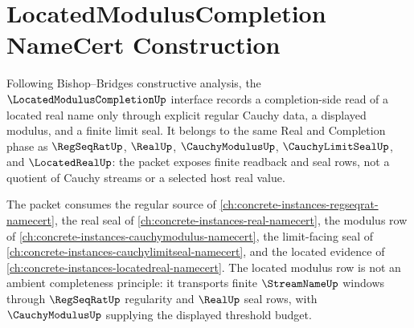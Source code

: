 \chapter{LocatedModulusCompletion NameCert Construction}
\label{ch:concrete-instances-locatedmoduluscompletion-namecert}

Following Bishop--Bridges constructive analysis, the $\LocatedModulusCompletionUp$ interface records a completion-side read of a located real name only through explicit regular Cauchy data, a displayed modulus, and a finite limit seal. It belongs to the same Real and Completion phase as $\RegSeqRatUp$, $\RealUp$, $\CauchyModulusUp$, $\CauchyLimitSealUp$, and $\LocatedRealUp$: the packet exposes finite readback and seal rows, not a quotient of Cauchy streams or a selected host real value.

The packet consumes the regular source of \autoref{ch:concrete-instances-regseqrat-namecert}, the real seal of \autoref{ch:concrete-instances-real-namecert}, the modulus row of \autoref{ch:concrete-instances-cauchymodulus-namecert}, the limit-facing seal of \autoref{ch:concrete-instances-cauchylimitseal-namecert}, and the located evidence of \autoref{ch:concrete-instances-locatedreal-namecert}. The located modulus row is not an ambient completeness principle: it transports finite $\StreamNameUp$ windows through $\RegSeqRatUp$ regularity and $\RealUp$ seal rows, with $\CauchyModulusUp$ supplying the displayed threshold budget.

